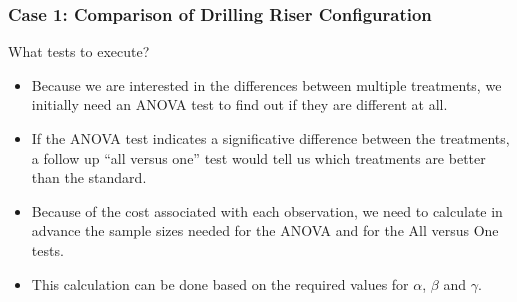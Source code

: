 \documentclass[10pt]{beamer}
\begin{document}
\begin{frame}
  \frametitle{Case 1: Comparison of Drilling Riser Configuration}
  \begin{block}{What tests to execute?}
    \begin{itemize}
    \item Because we are interested in the differences between
      multiple treatments, we initially need an ANOVA test to find out
      if they are different at all.
    \item If the ANOVA test indicates a significative difference
      between the treatments, a follow up ``all versus one'' test
      would tell us which treatments are better than the standard.
    \end{itemize}
  \end{block}
  
  \bigskip
  
  \begin{itemize}
  \item Because of the cost associated with each observation, we need
    to calculate in advance the sample sizes needed for the ANOVA and
    for the All versus One tests.
  \item This calculation can be done based on the required values for
    $\alpha$, $\beta$ and $\gamma$.
  \end{itemize}
\end{frame}
\end{document}
